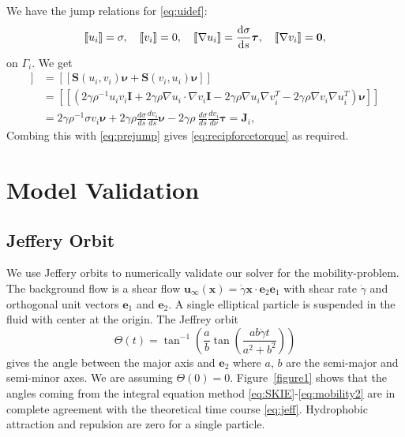 \documentclass[lineno]{jfm}
\newcommand{\JJ}{\mathbf{J}}
\newcommand{\nnu}{\boldsymbol{\nu}}
\newcommand{\ttau}{\boldsymbol{\tau}}
\newcommand{\xx}{\mathbf{x}}
\newcommand{\uu}{\mathbf{u}}
\newcommand{\jump}[1]{[\![ #1 ]\!]}
\begin{document}
We have the jump relations for \eqref{eq:uidef}: 
\begin{equation}
\label{eq:DLjump}
\jump{u_i} = \sigma, \quad
\jump{v_i} = 0, \quad
\jump{\nabla u_i} = \frac{\dif \sigma}{\dif s}\ttau,\quad
\jump{\nabla v_i} = \mathbf{0},
\end{equation}
on $\Gamma_i$. We get 
\begin{align*}
  \jump{{\bf T}_2\nnu}   &= \jump{\mathbf{S}(u_i,v_i)\nnu  +\mathbf{S}(v_i,u_i)\nnu} \\
  &= \jump{( 2\gamma\rho^{-1} u_i v_i \mathbf{I} + 2\gamma\rho \nabla u_i \cdot \nabla v_i \mathbf{I} 
- 2\gamma\rho \nabla u_i  \nabla v_i^T - 2\gamma\rho \nabla v_i \nabla u_i^T)  \nnu}\\
&= 2\gamma\rho^{-1} \sigma v_i \nnu + 2\gamma\rho \frac{d\sigma }{ds}\frac{dv_i }{ds} \nnu
- 2\gamma\rho \ \frac{d\sigma }{ds} \frac{dv_i }{d\nu} \ttau = \JJ_i,
\end{align*}
Combing  this with \eqref{eq:prejump}  gives  \eqref{eq:recipforcetorque}
as required. 





\section{\label{validation}Model Validation}

\subsection{Jeffery Orbit}
We use Jeffery orbits to numerically validate our solver for the mobility-problem.  
The background flow is a shear flow $\uu_{\infty}(\xx) = \dot\gamma  \xx \cdot \mathbf{e}_2 \mathbf{e}_1$ with shear rate $\dot\gamma$
and orthogonal unit vectors $\mathbf{e}_1$ and $\mathbf{e}_2$. 
A single elliptical particle is suspended in the fluid with center at the origin.
The Jeffrey orbit  
\begin{equation}
\label{eq:jeff}
\Theta(t) = \tan^{-1}\left(\frac{a}{b}\tan \left(\frac{ab \dot\gamma t}{a^2+b^2}\right)\right)
\end{equation}
gives the angle between the major axis and $\mathbf{e}_2$
where $a$, $b$ are the semi-major and semi-minor axes. 
We are assuming $\Theta(0) = 0$.
Figure~\ref{figure1} shows that the angles coming from the integral equation method \eqref{eq:SKIE}-\eqref{eq:mobility2}
are in complete agreement with the theoretical time course \eqref{eq:jeff}.  Hydrophobic attraction and repulsion are zero for a single particle. 
\end{document}
